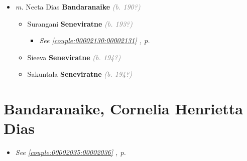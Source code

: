 \documentclass[10pt, openany]{book}
\begin{document}
\begin{itemize}
{\begin{itemize}
{\begin{itemize}
{\begin{itemize}
{\begin{itemize}
{\begin{itemize}
\item{Amanda \textbf{Seneviratne} \textcolor{gray}{\textit{(b. 198?)}}
 }
\item{Eshan \textbf{Seneviratne} \textcolor{gray}{\textit{(b. 198?)}}
 }
\end{itemize}}
\end{itemize}
 }
\end{itemize}}
\item{\textit{m.} Neeta Dias \textbf{Bandaranaike} \textcolor{gray}{\textit{(b. 190?)}}   \label{couple:00002152:00002153} \begin{itemize}
\item{Surangani \textbf{Seneviratne} \textcolor{gray}{\textit{(b. 193?)}}
\begin{itemize}
\item{\textcolor{slteal}{\textit{See  \autoref{couple:00002130:00002131} \textit{, p. \pageref{couple:00002130:00002131} }}}}
\end{itemize}
 }
\item{Sieeva \textbf{Seneviratne} \textcolor{gray}{\textit{(b. 194?)}}
 }
\item{Sakuntala \textbf{Seneviratne} \textcolor{gray}{\textit{(b. 194?)}}
 }
\end{itemize}}
\end{itemize}
 }
\end{itemize}}
\end{itemize}
   
\chapter{Bandaranaike, Cornelia Henrietta Dias}
\label{00002035}
\textcolor{slmaroon}{\textit{}}
\begin{itemize}
\item{\textcolor{slteal}{\textit{See  \autoref{couple:00002035:00002036} \textit{, p. \pageref{couple:00002035:00002036} }}}}
\end{itemize}
   
\end{document}
